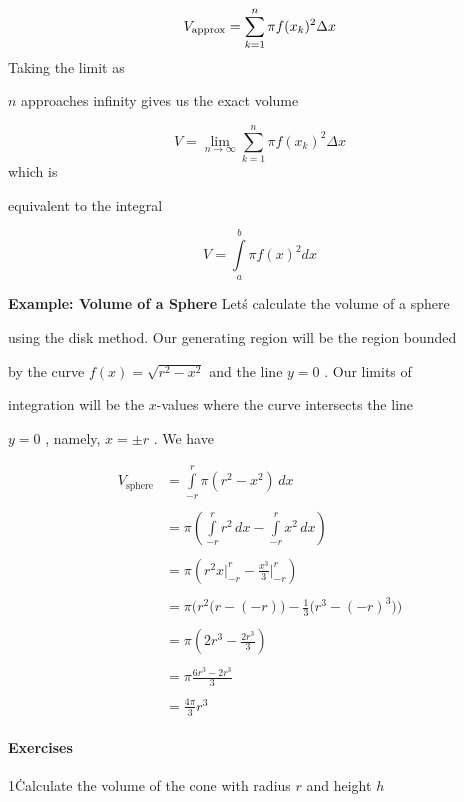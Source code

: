 $$V _{\rm approx}=\sum _{k=1}^n \pi f(x _k)^2\Delta x$$ Taking the limit as

$n$ approaches infinity gives us the exact volume



$$V=\lim _{n\to\infty}\sum _{k=1}^n \pi f(x _k)^2\Delta x$$ which is

equivalent to the integral



$$V=\int\limits_a^b \pi f(x)^2dx$$



\textbf{Example: Volume of a Sphere} Let\'s calculate the volume of a sphere

using the disk method. Our generating region will be the region bounded

by the curve $f(x)=\sqrt{r^2-x^2}$ and the line $y=0$ . Our limits of

integration will be the $x$-values where the curve intersects the line

$y=0$ , namely, $x=\pm r$ . We have



\begin{align} V _\text{sphere} &= \int\limits _{-r}^r \pi(r^2-x^2)\,dx \\\\ &= \pi\left(\int\limits _{-r}^r r^2\,dx - \int\limits _{-r}^r x^2\,dx\right) \\\\ &= \pi\left(r^2 x\bigg| _{-r}^r - \frac{x^3}{3}\bigg| _{-r}^r\right) \\\\ &= \pi\Big(r^2\bigl(r - (-r)\bigr) - \tfrac{1}{3}\bigl(r^3 - (-r)^3\bigr)\Big) \\\\ &= \pi\left(2r^3 - \frac{2r^3}{3}\right) \\\\ &= \pi\frac{6r^3 - 2r^3}{3} \\\\ &= \frac{4\pi}{3}r^3 \end{align} 



\paragraph{Exercises}



1\. Calculate the volume of the cone with radius $r$ and height $h$

